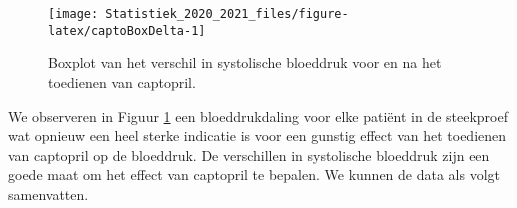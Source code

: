 \documentclass[
  12pt,dutch,coursenotes]{book}
\newenvironment{Shaded}{\begin{snugshade}}{\end{snugshade}}
\newcommand{\CommentTok}[1]{\textcolor[rgb]{0.56,0.35,0.01}{\textit{#1}}}
\newcommand{\DataTypeTok}[1]{\textcolor[rgb]{0.13,0.29,0.53}{#1}}
\newcommand{\KeywordTok}[1]{\textcolor[rgb]{0.13,0.29,0.53}{\textbf{#1}}}
\newcommand{\NormalTok}[1]{#1}
\newcommand{\OperatorTok}[1]{\textcolor[rgb]{0.81,0.36,0.00}{\textbf{#1}}}
\newcommand{\OtherTok}[1]{\textcolor[rgb]{0.56,0.35,0.01}{#1}}
\newcommand{\StringTok}[1]{\textcolor[rgb]{0.31,0.60,0.02}{#1}}
\theoremstyle{definition}
\theoremstyle{definition}
\theoremstyle{definition}
\theoremstyle{remark}
\begin{document}
\begin{Shaded}
\end{Shaded}

\begin{figure}

{\centering \texttt{[image: Statistiek\_2020\_2021\_files/figure-latex/captoBoxDelta-1]} 

}

\caption{Boxplot van het verschil in systolische bloeddruk voor en na het toedienen van captopril.}\label{fig:captoBoxDelta}
\end{figure}

We observeren in Figuur \ref{fig:captoBoxDelta} een bloeddrukdaling voor elke patiënt in de steekproef wat opnieuw een heel sterke indicatie is voor een gunstig effect van het toedienen van captopril op de bloeddruk.
De verschillen in systolische bloeddruk zijn een goede maat om het effect van captopril te bepalen.
We kunnen de data als volgt samenvatten.
\end{document}

